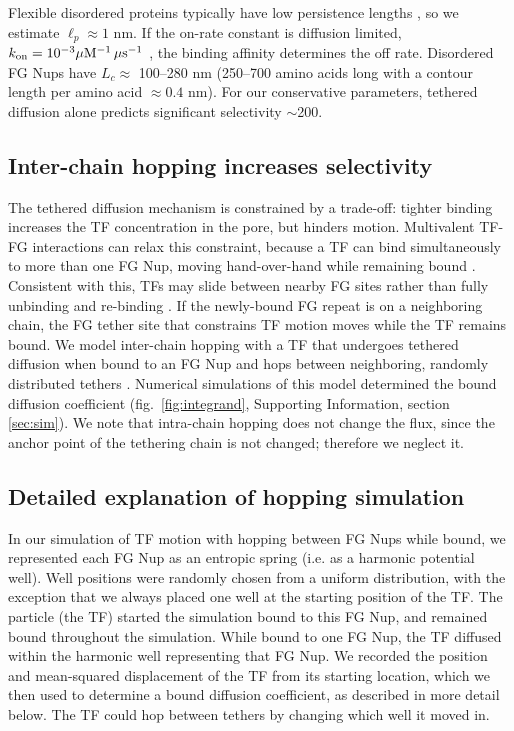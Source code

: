 Flexible disordered proteins typically have low persistence lengths \cite{receveur-brechot12}, so we estimate $\ell_p \approx 1$ nm.  If the on-rate constant is diffusion limited, $k_{\rm on} = 10^{-3}\mu \mathrm{M}^{-1} \, \mu \mathrm{s}^{-1}$ \cite{milles15, hough15}, the binding affinity determines the off rate.  Disordered FG Nups have $L_c\approx$ 100--280 nm (250--700 amino acids long \cite{patel07} with a contour length per amino acid $\approx 0.4$ nm). For our conservative parameters, tethered diffusion alone predicts significant selectivity $\sim$200.

\subsection{Inter-chain hopping increases selectivity}
The tethered diffusion mechanism is constrained by a trade-off:
tighter binding increases the TF concentration in the pore, but
hinders motion.  Multivalent TF-FG interactions can relax this
constraint, because a TF can bind simultaneously to more than one FG
Nup, moving hand-over-hand while remaining bound
\cite{tetenbaum-novatt12}. Consistent with this, TFs may slide between
nearby FG sites rather than fully unbinding and re-binding
\cite{raveh16}. If the newly-bound FG repeat is on a neighboring
chain, the FG tether site that constrains TF motion moves while the TF
remains bound.  We model inter-chain hopping with a TF that undergoes
tethered diffusion when bound to an FG Nup and hops between
neighboring, randomly distributed tethers .
Numerical simulations of this model determined the bound diffusion
coefficient (fig.~\ref{fig:integrand}, Supporting Information, section
\ref{sec:sim}). We note that intra-chain hopping does not change the
flux, since the anchor point of the tethering chain is not changed;
therefore we neglect it.

\subsection{Detailed explanation of hopping simulation}
In our simulation of TF motion with hopping between FG Nups while bound, we represented each FG Nup as an entropic spring (i.e. as a harmonic potential well).  Well positions were randomly chosen from a uniform distribution, with the exception that we always placed one well at the starting position of the TF.  The particle (the TF) started the simulation bound to this FG Nup, and remained bound throughout the simulation.  While bound to one FG Nup, the TF diffused within the harmonic well representing that FG Nup. We recorded the position and mean-squared displacement of the TF from its starting location, which we then used to determine a bound diffusion coefficient, as described in more detail below.  The TF could hop between tethers by changing which well it moved in.

